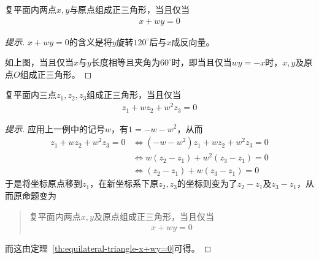 \begin{theorem}\label{th:equilateral-triangle-x+wy=0}
  复平面内两点$x,y$与原点组成正三角形，当且仅当
  \begin{align*}
    x + wy = 0
  \end{align*}
\end{theorem}
\begin{proof}[提示]
  $x+wy=0$的含义是将$y$旋转$120^\circ$后与$x$成反向量。
  \begin{center}
  \end{center}
  如上图，当且仅当$x$与$y$长度相等且夹角为$60^\circ$时，即当且仅当$wy=-x$时，$x,y$及原点$O$组成正三角形。
\end{proof}

\begin{theorem}\label{th:equilateral-triangle-z1+wz2+w2z3}
  复平面内三点$z_1,z_2,z_3$组成正三角形，当且仅当
  \begin{align*}
    z_1 + wz_2 + w^2z_3 = 0
  \end{align*}
\end{theorem}
\begin{proof}[提示]
  应用上一例中的记号$w$，有$1=-w-w^2$，从而
  \begin{align*}
    z_1 + wz_2 + w^2z_3 = 0 &\iff (-w-w^2)z_1 + wz_2 + w^2z_3 = 0 \\
                            & \iff w\left(z_2-z_1\right) + w^2\left(z_3-z_1\right) = 0\\
                            & \iff \left(z_2-z_1\right) + w\left(z_3-z_1\right) = 0
  \end{align*}
  于是将坐标原点移到$z_1$，在新坐标系下原$z_2,z_3$的坐标则变为了$z_2-z_1$及$z_3-z_1$，从而原命题变为
  \begin{quotation}
    复平面内两点$x,y$及原点组成正三角形，当且仅当
    \begin{align*}
      x + wy = 0
    \end{align*}
  \end{quotation}
  而这由定理~\ref{th:equilateral-triangle-x+wy=0}可得。
\end{proof}

